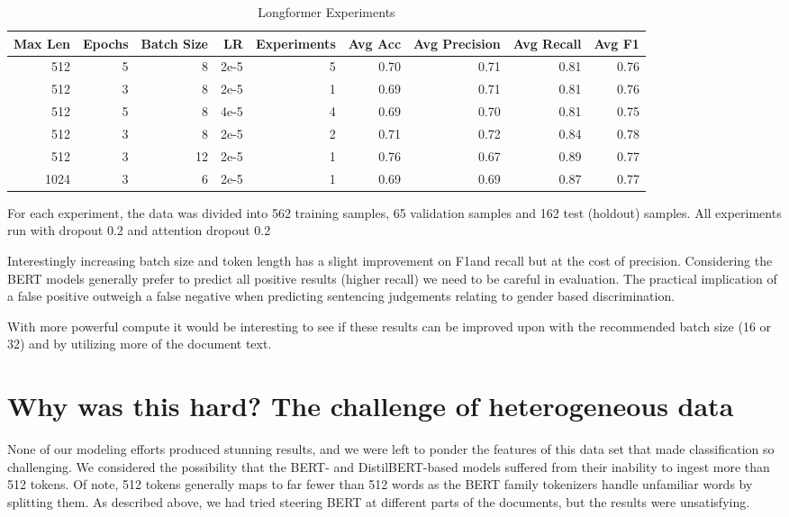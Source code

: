 \documentclass[twocolumn,10pt]{wmrDoc}
\begin{document}
\begin{table*}
 \caption{Longformer Experiments}
  \centering
  \begin{tabular}{rrrrrrrrr}
    \toprule
    Max Len & Epochs & Batch Size & LR & Experiments & Avg Acc & Avg Precision & Avg Recall & Avg F1 \\
    \midrule
    512 & 5 & 8  & 2e-5 & 5 & 0.70 & 0.71 & 0.81 & 0.76 \\
    512 & 3 & 8  & 2e-5 & 1 & 0.69 & 0.71 & 0.81 & 0.76 \\
    512 & 5 & 8  & 4e-5 & 4 & 0.69 & 0.70 & 0.81 & 0.75 \\
    512 & 3 & 8  & 2e-5 & 2 & 0.71 & 0.72 & 0.84 & 0.78 \\
    512 & 3 & 12 & 2e-5 & 1 & 0.76 & 0.67 & 0.89 & 0.77 \\
    1024 & 3 & 6 & 2e-5 & 1 & 0.69 & 0.69 & 0.87 & 0.77 \\
    \bottomrule
  \end{tabular}
  \label{tab:longformer}
\end{table*}

For each experiment, the data was divided into 562 training samples, 65 validation samples and 162 test (holdout) samples. All experiments run with dropout 0.2 and attention dropout 0.2

Interestingly increasing batch size and token length has a slight improvement on F1and recall but at the cost of precision. Considering the BERT models generally prefer to predict all positive results (higher recall) we need to be careful in evaluation. The practical implication of a false positive outweigh a false negative when predicting sentencing judgements relating to gender based discrimination.

With more powerful compute it would be interesting to see if these results can be improved upon with the recommended batch size (16 or 32) and by utilizing more of the document text.

\section{Why was this hard? The challenge of heterogeneous data}
None of our modeling efforts produced stunning results, and we were left to ponder the features of this data set that made classification so challenging.  We considered the possibility that the BERT- and DistilBERT-based models suffered from their inability to ingest more than 512 tokens.  Of note, 512 tokens generally maps to far fewer than 512 words as the BERT family tokenizers handle unfamiliar words by splitting them.  As described above, we had tried steering BERT at different parts of the documents, but the results were unsatisfying.
\end{document}
